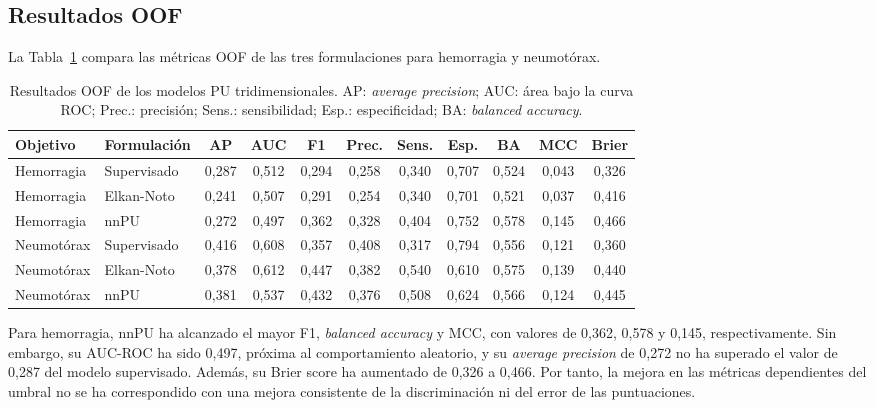 \subsection{Resultados OOF}


La Tabla~\ref{tab:pu3d_resultados_oof} compara las métricas OOF de las tres formulaciones para hemorragia y neumotórax.

\begin{table}[!htbp]
\centering
\caption{Resultados OOF de los modelos PU tridimensionales. AP: \textit{average precision}; AUC: área bajo la curva ROC; Prec.: precisión; Sens.: sensibilidad; Esp.: especificidad; BA: \textit{balanced accuracy}.}
\label{tab:pu3d_resultados_oof}
\scriptsize
\begin{adjustbox}{max width=\textwidth}
\begin{tabular}{llccccccccc}
\toprule
\textbf{Objetivo} & \textbf{Formulación} & \textbf{AP} & \textbf{AUC} & \textbf{F1} & \textbf{Prec.} & \textbf{Sens.} & \textbf{Esp.} & \textbf{BA} & \textbf{MCC} & \textbf{Brier} \\
\midrule
Hemorragia & Supervisado & 0,287 & 0,512 & 0,294 & 0,258 & 0,340 & 0,707 & 0,524 & 0,043 & 0,326 \\
Hemorragia & Elkan-Noto & 0,241 & 0,507 & 0,291 & 0,254 & 0,340 & 0,701 & 0,521 & 0,037 & 0,416 \\
Hemorragia & nnPU & 0,272 & 0,497 & 0,362 & 0,328 & 0,404 & 0,752 & 0,578 & 0,145 & 0,466 \\
\midrule
Neumotórax & Supervisado & 0,416 & 0,608 & 0,357 & 0,408 & 0,317 & 0,794 & 0,556 & 0,121 & 0,360 \\
Neumotórax & Elkan-Noto & 0,378 & 0,612 & 0,447 & 0,382 & 0,540 & 0,610 & 0,575 & 0,139 & 0,440 \\
Neumotórax & nnPU & 0,381 & 0,537 & 0,432 & 0,376 & 0,508 & 0,624 & 0,566 & 0,124 & 0,445 \\
\bottomrule
\end{tabular}
\end{adjustbox}
\end{table}

Para hemorragia, nnPU ha alcanzado el mayor F1, \textit{balanced accuracy} y MCC, con valores de 0,362, 0,578 y 0,145, respectivamente. Sin embargo, su AUC-ROC ha sido 0,497, próxima al comportamiento aleatorio, y su \textit{average precision} de 0,272 no ha superado el valor de 0,287 del modelo supervisado. Además, su Brier score ha aumentado de 0,326 a 0,466. Por tanto, la mejora en las métricas dependientes del umbral no se ha correspondido con una mejora consistente de la discriminación ni del error de las puntuaciones.


